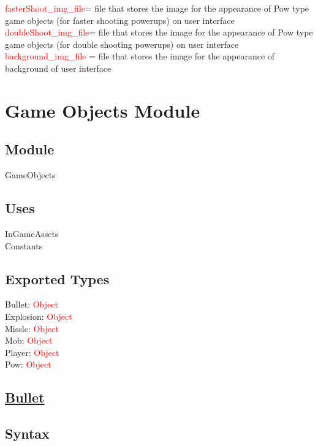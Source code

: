 \documentclass[12pt, titlepage]{article}
\begin{document}
\newline
\newline
\textcolor{red}{fasterShoot\_img\_file}= file that stores the image for the appearance of Pow type game objects (for faster shooting powerups) on user interface
\newline
\textcolor{red}{doubleShoot\_img\_file}= file that stores the image for the appearance of Pow type game objects (for double shooting powerups) on user interface
\newline
\textcolor{red}{background\_img\_file} = file that stores the image for the appearance of background of user interface

\newpage

\section* {Game Objects Module}
\subsection* {Module}

GameObjects

\subsection* {Uses}

\noindent InGameAssets\\
\noindent Constants 

\subsection* {Exported Types}

Bullet: \textcolor{red}{Object}\\
Explosion: \textcolor{red}{Object}\\
Missle: \textcolor{red}{Object}\\
Mob: \textcolor{red}{Object}\\
Player: \textcolor{red}{Object}\\
Pow: \textcolor{red}{Object}\\


\subsection* {\underline{Bullet}} 
\subsection* {Syntax} 
\end{document}
